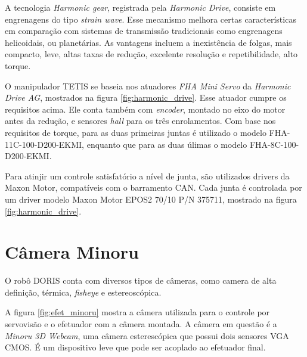 A tecnologia \textit{Harmonic gear}, registrada pela \textit{Harmonic Drive}, consiste em engrenagens do tipo \textit{strain wave}. Esse mecanismo melhora certas características em comparação com sistemas de transmissão tradicionais como engrenagens helicoidais, ou planetárias. As vantagens incluem a inexistência de folgas, mais compacto, leve, altas taxas de redução, excelente resolução e repetibilidade, alto torque.

O manipulador TETIS se baseia nos atuadores \textit{FHA Mini Servo} da \textit{Harmonic Drive AG}, mostrados na figura \ref{fig:harmonic_drive}. Esse atuador cumpre os requisitos acima. Ele conta também com \textit{encoder}, montado no eixo do motor antes da redução, e sensores \textit{hall} para os três enrolamentos. Com base nos requisitos de torque, para as duas primeiras juntas é utilizado o modelo FHA-11C-100-D200-EKMI, enquanto que para as duas úlimas o modelo FHA-8C-100-D200-EKMI.

Para atinjir um controle satisfatório a nível de junta, são utilizados drivers da Maxon Motor, compatíveis com o barramento CAN. Cada junta é controlada por um driver modelo Maxon Motor EPOS2 70/10 P/N 375711, mostrado na figura \ref{fig:harmonic_drive}.

\section{Câmera Minoru} \label{sec:minoru}

O robô DORIS conta com diversos tipos de câmeras, como camera de alta definição, térmica, \textit{fisheye} e estereoscópica. 

A figura \ref{fig:efet_minoru} mostra a câmera utilizada para o controle por servovisão e o efetuador com a câmera montada.
A câmera em questão é a \textit{Minoru 3D Webcam}, uma câmera esterescópica que possui dois sensores VGA CMOS. É um dispositivo leve que pode ser acoplado ao efetuador final.

